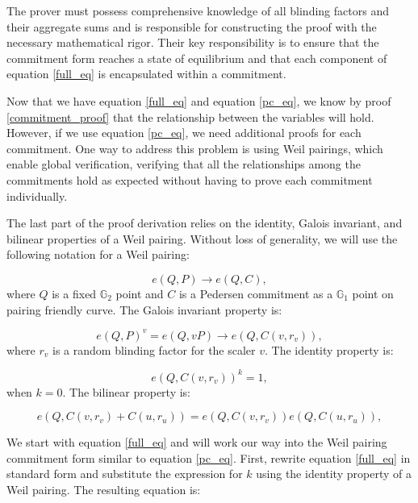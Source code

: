 \documentclass[version=preprint]{iacrcc}
\begin{document}
The prover must possess comprehensive knowledge of all blinding factors and their aggregate sums and is responsible for constructing the proof with the necessary mathematical rigor. Their key responsibility is to ensure that the commitment form reaches a state of equilibrium and that each component of equation \ref{full_eq} is encapsulated within a commitment.

Now that we have equation \ref{full_eq} and equation \ref{pc_eq}, we know by proof \ref{commitment_proof} that the relationship between the variables will hold. However, if we use equation \ref{pc_eq}, we need additional proofs for each commitment. One way to address this problem is using Weil pairings, which enable global verification, verifying that all the relationships among the commitments hold as expected without having to prove each commitment individually.

The last part of the proof derivation relies on the identity, Galois invariant, and bilinear properties \cite{silverman86} of a Weil pairing. Without loss of generality, we will use the following notation for a Weil pairing:

\begin{equation}
e(Q, P) \rightarrow e(Q, C),
\end{equation}
where \( Q \) is a fixed \( \mathbb{G}_{2} \) point and \(C\) is a Pedersen commitment as a \( \mathbb{G}_{1} \) point on pairing friendly curve. The Galois invariant property is:

\begin{equation}
e(Q, P)^v = e(Q, v P) \rightarrow e(Q, C(v, r_{v})),
\end{equation}
where $r_{v}$ is a random blinding factor for the scaler $v$. The identity property is:

\begin{equation}
e(Q, C(v, r_{v}))^{k} = 1,
\end{equation}
when \( k = 0 \). The bilinear property is:

\begin{equation}
e(Q, C(v, r_{v}) + C(u, r_{u})) = e(Q, C(v, r_{v}))e(Q, C(u, r_{u})),
\end{equation}

We start with equation \ref{full_eq} and will work our way into the Weil pairing commitment form similar to equation \ref{pc_eq}. First, rewrite equation \ref{full_eq} in standard form and substitute the expression for \( k \) using the identity property of a Weil pairing. The resulting equation is:
\end{document}
